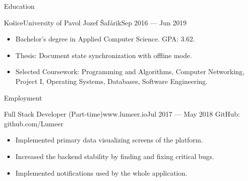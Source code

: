 \documentclass[]{style}
\begin{document}
	\makeheader
	
	\begin{cvsection}{Education}
		\begin{cvsubsection}{Košice}{University of Pavol Jozef Šafárik}{Sep 2016 — Jun 2019}
			\begin{itemize}
				\item Bachelor's degree in Applied Computer Science. GPA: 3.62.
				\item Thesis: Document state synchronization with offline mode.
				\item Selected Coursework: Programming and Algorithms, Computer Networking, Project I, Operating Systems, Databases, Software Engineering.
			\end{itemize}
		\end{cvsubsection}
	\end{cvsection}

	\begin{cvsection}{Employment}
		\begin{cvsubsection}{Full Stack Developer (Part-time)}{www.lumeer.io}{Jul 2017 — May 2018}
			GitHub: github.com/Lumeer
			\begin{itemize}
				\item Implemented primary data visualizing screens of the platform.
				\item Increased the backend stability by finding and fixing critical bugs.
				\item Implemented notifications used by the whole application.							
			\end{itemize}
		\end{cvsubsection}
	\end{cvsection}
	
\end{document}
